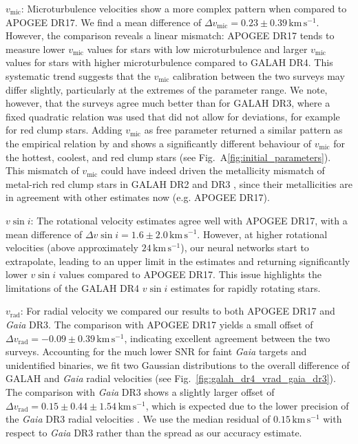 \documentclass[
  journal=pasa,
  manuscript=research-paper, %
  year=2024,
  volume=37
]{cup-journal}
\newcommand{\vmic}{$v_\mathrm{mic}$\xspace}
\newcommand{\vsini}{$v \sin i$\xspace}
\newcommand{\vrad}{$v_\mathrm{rad}$\xspace}
\newcommand{\Gaia}{\textit{Gaia}\xspace}
\begin{document}
\vmic: Microturbulence velocities show a more complex pattern when compared to APOGEE DR17. We find a mean difference of $\Delta v_\mathrm{mic} = 0.23 \pm 0.39\,\mathrm{km\,s^{-1}}$. However, the comparison reveals a linear mismatch: APOGEE DR17 tends to measure lower \vmic values for stars with low microturbulence and larger \vmic values for stars with higher microturbulence compared to GALAH DR4. This systematic trend suggests that the \vmic calibration between the two surveys may differ slightly, particularly at the extremes of the parameter range. We note, however, that the surveys agree much better than for GALAH DR3, where a fixed quadratic relation was used that did not allow for deviations, for example for red clump stars. Adding \vmic as free parameter returned a similar pattern as the empirical relation by \citet{DutraFerreira2016} and shows a significantly different behaviour of \vmic for the hottest, coolest, and red clump stars (see Fig.~A\ref{fig:initial_parameters}). This mismatch of \vmic could have indeed driven the metallicity mismatch of metal-rich red clump stars in GALAH DR2 and DR3 \citep{Buder2018, Buder2021}, since their metallicities are in agreement with other estimates now (e.g. APOGEE DR17).

\vsini: The rotational velocity estimates agree well with APOGEE DR17, with a mean difference of $\Delta v \sin i = 1.6 \pm 2.0\,\mathrm{km\,s^{-1}}$. However, at higher rotational velocities (above approximately $24\,\mathrm{km\,s^{-1}}$), our neural networks start to extrapolate, leading to an upper limit in the estimates and returning significantly lower \vsini values compared to APOGEE DR17. This issue highlights the limitations of the GALAH DR4 \vsini estimates for rapidly rotating stars.

\vrad: For radial velocity we compared our results to both APOGEE DR17 and \Gaia DR3. The comparison with APOGEE DR17 yields a small offset of $\Delta v_\mathrm{rad} = -0.09 \pm 0.39\,\mathrm{km\,s^{-1}}$, indicating excellent agreement between the two surveys. Accounting for the much lower SNR for faint \Gaia targets and unidentified binaries, we fit two Gaussian distributions to the overall difference of GALAH and \Gaia radial velocities (see Fig.~\ref{fig:galah_dr4_vrad_gaia_dr3}). The comparison with \Gaia DR3 shows a slightly larger offset of $\Delta v_\mathrm{rad} = 0.15 \pm 0.44 \pm 1.54\,\mathrm{km\,s^{-1}}$, which is expected due to the lower precision of the \Gaia DR3 radial velocities \citep{Katz2023}. We use the median residual of $0.15\,\mathrm{km\,s^{-1}}$ with respect to \Gaia DR3 rather than the spread as our accuracy estimate.
\end{document}
